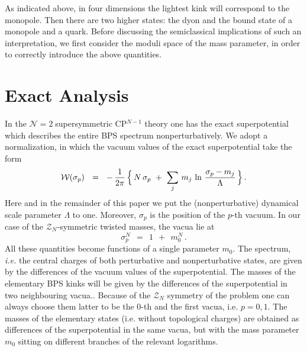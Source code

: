 \documentclass[epsfig,12pt]{article}
\def\beq{\begin{equation}}
\def\eeq{\end{equation}}
\newcommand{\ntwo}{${\mathcal N}=2\;$}
\def\beq{\begin{equation}}
\def\eeq{\end{equation}}
\newcommand{\mc}[1]{\mathcal{#1}}
\newcommand{\W}{\mathcal{W}}
\begin{document}
	
	As indicated above, in four dimensions 
	the lightest kink will correspond to the monopole. Then there are two higher states: the dyon and
  the bound state of a monopole and a quark.
	Before discussing the semiclassical implications of such an interpretation, we first
	consider the moduli space of the mass parameter, 
	in order to correctly introduce the above quantities.



\section{Exact Analysis}
\setcounter{equation}{0}

	In the \ntwo supersymmetric CP$^{N-1}$ theory one has the exact superpotential which
	  describes the entire BPS  spectrum nonperturbatively.
	We adopt a normalization, in which the vacuum values of the exact superpotential take 
	the form
\beq
\label{Wvac}
	\W ( \sigma_p ) ~~=~~ 
		-\, \frac{1}{2\pi}\,  
                \Bigl\{\, N\, \sigma_p ~+~ \sum_j\, m_j\, \ln \,\frac{\sigma_p - m_j}{\Lambda} \,\Bigr\}\,.
\eeq
	Here and in the remainder of this   paper we put the (nonperturbative) dynamical scale parameter $ \Lambda $ to one.
	Moreover, $ \sigma_p $ is   the position of the $p$-th vacuum.
	In our case of the $ \mc{Z}_N $-symmetric twisted masses, the vacua lie at
\beq
\label{sig}
	\sigma_p^N  ~~=~~ 1 ~~+~~ m_0^N \,.
\eeq
	All these quantities become functions of a single parameter $ m_0 $.
	The spectrum, {\it i.e.} the central charges of both perturbative and nonperturbative states,
	are given by the differences of the vacuum values of the superpotential.
	The masses of the elementary BPS kinks will be given by the differences of the superpotential in
	two neighbouring vacua..
	Because of the $ \mc{Z}_N $ symmetry of the problem one can always choose them latter to be 
	the 0-th and the first vacua,  i.e. $p=0,1$.
	The masses of the elementary states (i.e. without topological charges) are obtained as differences of the superpotential in the
	same vacua, but with the mass parameter $ m_0 $ sitting on different branches of 
	the relevant logarithms.
\end{document}
